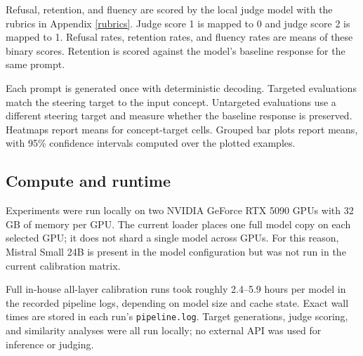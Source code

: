 \documentclass{article}
\begin{document}
Refusal, retention, and fluency are scored by the local judge model with the
rubrics in Appendix \ref{rubrics}. Judge score 1 is mapped to 0 and judge score
2 is mapped to 1. Refusal rates, retention rates, and fluency rates are means
of these binary scores. Retention is scored against the model's baseline
response for the same prompt.

Each prompt is generated once with deterministic decoding. Targeted evaluations
match the steering target to the input concept. Untargeted evaluations use a
different steering target and measure whether the baseline response is
preserved. Heatmaps report means for concept-target cells. Grouped bar plots
report means, with 95\% confidence intervals computed over the plotted
examples.

\subsection{Compute and runtime}

Experiments were run locally on two NVIDIA GeForce RTX 5090 GPUs with 32 GB of
memory per GPU. The current loader places one full model copy on each selected
GPU; it does not shard a single model across GPUs. For this reason, Mistral
Small 24B is present in the model configuration but was not run in the current
calibration matrix.

Full in-house all-layer calibration runs took roughly 2.4--5.9 hours per model
in the recorded pipeline logs, depending on model size and cache state. Exact
wall times are stored in each run's \texttt{pipeline.log}. Target generations,
judge scoring, and similarity analyses were all run locally; no external API
was used for inference or judging.
\end{document}
